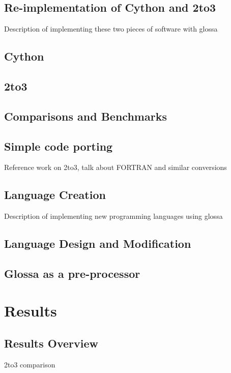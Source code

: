 \documentclass{article}
\begin{document}
\subsection{Re-implementation of Cython and 2to3}
Description of implementing these two pieces of software with glossa

\subsection{Cython}
\subsection{2to3}

\subsection{Comparisons and Benchmarks}

\subsection{Simple code porting}
Reference work on 2to3, talk about FORTRAN and similar conversions

\subsection{Language Creation}
Description of implementing new programming languages using glossa

\subsection{Language Design and Modification}
\subsection{Glossa as a pre-processor}

\section{Results}

\subsection{Results Overview}

2to3 comparison
\end{document}
